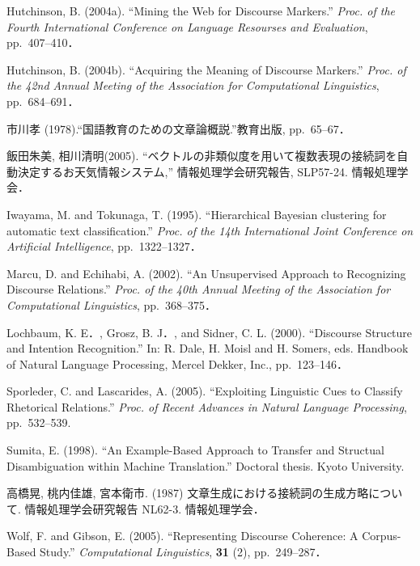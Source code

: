 \documentclass[japanese]{jnlp_1.4}
\begin{document}
\begin{thebibliography}{}

\item
Hutchinson, B. (2004a). ``Mining the Web for Discourse Markers.'' \textit{Proc. of 
the Fourth International Conference on Language Resourses and Evaluation}, 
pp.~407--410．

\item
Hutchinson, B. (2004b). ``Acquiring the Meaning of Discourse Markers.'' 
\textit{Proc. of the 42nd Annual Meeting of the Association for Computational 
Linguistics}, pp.~684--691．

\item
市川孝 (1978).“国語教育のための文章論概説.”教育出版, pp.~65--67．

\item
飯田朱美, 相川清明(2005). 
“ベクトルの非類似度を用いて複数表現の接続詞を自動決定するお天気情報システム,”
情報処理学会研究報告, SLP57-24. 情報処理学会．

\item
Iwayama, M. and Tokunaga, T. (1995). ``Hierarchical Bayesian clustering for 
automatic text classification.'' \textit{Proc. of the 14th International Joint 
Conference on Artificial Intelligence}, pp.~1322--1327．

\item
Marcu, D. and Echihabi, A. (2002). ``An Unsupervised Approach to Recognizing 
Discourse Relations.'' \textit{Proc. of the 40th Annual Meeting of the Association 
for Computational Linguistics}, pp.~368--375．

\item
Lochbaum, K. E．, Grosz, B. J．, and Sidner, C. L. (2000). ``Discourse 
Structure and Intention Recognition.'' In: R. Dale, H. Moisl and H. Somers, 
eds. Handbook of Natural Language Processing, Mercel Dekker, Inc., 
pp.~123--146．

\item
Sporleder, C. and Lascarides, A. (2005). ``Exploiting Linguistic Cues to 
Classify Rhetorical Relations.'' \textit{Proc. of Recent Advances in Natural 
Language Processing}, pp.~532--539.

\item
Sumita, E. (1998). ``An Example-Based Approach to Transfer and 
Structual Disambiguation within Machine Translation.'' Doctoral thesis. 
Kyoto University.

\item
高橋晃, 桃内佳雄, 宮本衛市. (1987) 
文章生成における接続詞の生成方略について. 情報処理学会研究報告 NL62-3. 
情報処理学会．

\item
Wolf, F. and Gibson, E. (2005). ``Representing Discourse Coherence: A 
Corpus-Based Study.'' \textit{Computational Linguistics}, \textbf{31} (2), 
pp.~249--287．
\end{thebibliography}
\end{document}
